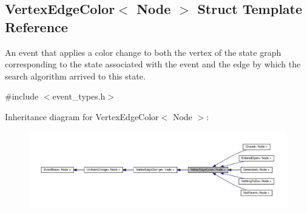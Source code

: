 \hypertarget{structVertexEdgeColor}{}\subsection{Vertex\+Edge\+Color$<$ Node $>$ Struct Template Reference}
\label{structVertexEdgeColor}


An event that applies a color change to both the vertex of the state graph corresponding to the state associated with the event and the edge by which the search algorithm arrived to this state.  




{\ttfamily \#include $<$event\+\_\+types.\+h$>$}



Inheritance diagram for Vertex\+Edge\+Color$<$ Node $>$\+:\nopagebreak
\begin{figure}[H]
\begin{center}
\leavevmode
\includegraphics[width=350pt]{structVertexEdgeColor__inherit__graph}
\end{center}
\end{figure}


